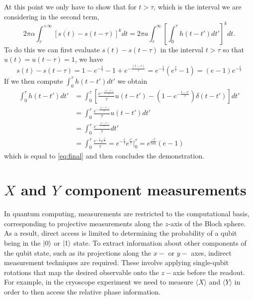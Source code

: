 At this point we only have to show that for $t>\tau$, which is the interval we are considering in the second term, 
\begin{equation}
    2\pi\alpha \int_{\tau}^{+\infty} \left[ s(t) - s(t-\tau) \right]^k dt = 2\pi a \int_{\tau}^{\infty} \left[ \int_{0}^{\tau} h(t - t') dt' \right]^k dt.
\end{equation}
%
To do this we can first evaluate $s(t)-s(t-\tau)$ in the interval $t>\tau$ so that $u(t)=u(t-\tau)=1$, we have
\begin{equation}\label{eq:final}
    s(t) - s(t-\tau) = 1- e^{-\frac{t}{\tau}} - 1 + e^{-\frac{(t-\tau)}{\tau}} = e^{-\frac{t}{\tau}} \left(e^{\frac{\tau}{\tau}}-1\right) = (e-1)e^{-\frac{t}{\tau}}
\end{equation}
%
If we then compute $\int_{0}^{\tau} h(t - t')dt'$ we obtain
\begin{align}
    \int_{0}^{\tau} h(t-t')dt' &= \int_{0}^{\tau} \left[ \frac{e^{-\frac{(t-t')}{\tau}}}{\tau} u(t-t') - \left(1-e^{-\frac{t-t'}{\tau}}\right)\delta(t-t') \right] dt'\\
    &= \int_{0}^{\tau} \frac{e^{-\frac{(t-t')}{\tau}}}{\tau} u(t-t')dt' \\
    &= \int_{0}^{\tau} \frac{e^{-\frac{(t-t')}{\tau}}}{\tau} dt'\\
    &= \int_{0}^{\tau} \frac{e^{-\frac{t}{\tau}}e^{\frac{t'}{\tau}}}{\tau} = e^{-\frac{t}{\tau}}e^{\frac{t'}{\tau}}\Big|_{0}^{\tau} = e^{\frac{-t}{tau}}(e-1)
\end{align}
which is equal to \ref{eq:final} and then concludes the demonstration.

\chapter{$X$ and $Y$ component measurements}
\label{app:XY_measure}

In quantum computing, measurements are restricted to the computational basis, corresponding to projective measurements along the $z$-axis of the Bloch sphere. 
As a result, direct access is limited to determining the probability of a qubit being in the $\ket{0}$ or $\ket{1}$ state.
To extract information about other components of the qubit state, such as its projections along the $x-$ or $y-$ axes, indirect measurement techniques are required. 
These involve applying single-qubit rotations that map the desired observable onto the $z-$axis before the readout.
For example, in the cryoscope experiment we need to measure $\langle X \rangle$ and $\langle Y \rangle$ in order to then access the relative phase information.
 
